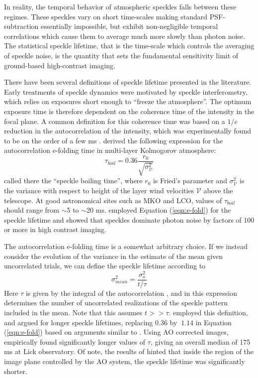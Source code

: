 \documentclass[10pt,preprint]{aastex631}
\begin{document}
In reality, the temporal behavior of atmospheric speckles falls between these regimes. These speckles vary on short time-scales making standard PSF-subtraction essentially impossible, but exhibit non-negligible temporal correlations which cause them to average much more slowly than photon noise.  The statistical speckle lifetime, that is the time-scale which controls the averaging of speckle noise, is the quantity that sets the fundamental sensitivity limit of ground-based high-contrast imaging.

There have been several definitions of speckle lifetime presented in the literature.  Early treatments of speckle dynamics were motivated by speckle interferometry, which relies on exposures short enough to ``freeze the atmosphere''.  The optimum exposure time is therefore dependent on the coherence time of the intensity in the focal plane.  A common definition for this coherence time was based on a $1/e$ reduction in the autocorrelation of the intensity, which was experimentally found to be on the order of a few ms \citep{1978ApOpt..17.3779S,1990JMOp...37.1247D}.    \citet{1982JOpt...13..263R} derived the following expression for the autocorrelation e-folding time in multi-layer Kolmogorov atmosphere:
\begin{equation}
\tau_{boil} = 0.36 \frac{r_0}{\sqrt{\sigma^2_\mathcal{V}}}
\label{eqn:e-fold}
\end{equation}
called there the ``speckle boiling time'', where $r_0$ is Fried's parameter and $\sigma^2_\mathcal{V}$ is the variance with respect to height of the layer wind velocities $\mathcal{V}$  above the telescope.  At good astronomical sites such as MKO and LCO, values of $\tau_{boil}$ should range from $\sim$5 to $\sim$20 ms. \citet{1999PASP..111..587R} employed Equation (\ref{eqn:e-fold}) for the speckle lifetime and showed that speckles dominate photon noise by factors of 100 or more in high contrast imaging.

The autocorrelation e-folding time is a somewhat arbitrary choice.  If we instead consider the evolution of the variance in the estimate of the mean given uncorrelated trials, we can define the speckle lifetime according to
\begin{equation}
\sigma_{mean}^2 = \frac{\sigma_o^2}{t/\tau}
\label{eqn:varmean_def_intro}
\end{equation}
Here $\tau$ is given by the integral of the autocorrelation \citep{2006ApJ...637..541F}, and in this expression determines the number of uncorrelated realizations of the speckle pattern included in the mean.  Note that this assumes $t >> \tau$.  \citet{1986JOSAA...3.1001A} employed this definition, and argued for longer speckle lifetimes, replacing $0.36$ by $~$$1.14$ in Equation (\ref{eqn:e-fold}) based on arguments similar to \citet{1982JOpt...13..263R}.  Using AO corrected images, \citet{2006ApJ...637..541F} empirically found significantly longer values of $\tau$, giving an overall median of 175 ms at Lick observatory.  Of note, the results of \citet{2006ApJ...637..541F} hinted that inside the region of the image plane controlled by the AO system, the speckle lifetime was significantly shorter.
\end{document}
